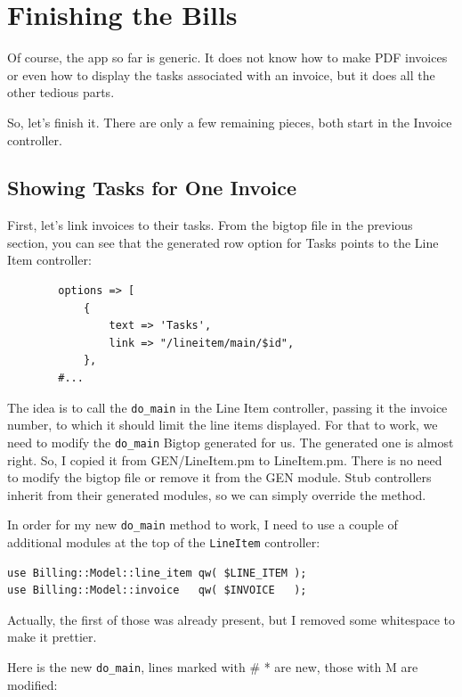\section{Finishing the Bills}

Of course, the app so far is generic.  It does not know how to make PDF
invoices or even how to display the tasks associated with an invoice, but
it does all the other tedious parts.

So, let's finish it.  There are only a few remaining pieces, both start in
the Invoice controller.

\subsection*{Showing Tasks for One Invoice}

First, let's link invoices to their tasks.  From the bigtop file in the
previous section, you can see that the generated row option for Tasks points
to the Line Item controller:

\begin{verbatim}
        options => [
            {
                text => 'Tasks',
                link => "/lineitem/main/$id",
            },
        #...
\end{verbatim}

The idea is to call the \verb+do_main+ in the Line Item controller, passing
it the invoice number, to which it should limit the line items displayed.
For that to work, we need to modify the \verb+do_main+ Bigtop generated
for us.  The generated one is almost right.  So, I copied it from
GEN/LineItem.pm to LineItem.pm.  There is no need to modify the bigtop file
or remove it from the GEN module.  Stub controllers inherit from their
generated modules, so we can simply override the method.

In order for my new \verb+do_main+ method to work, I need to use a couple
of additional modules at the top of the \verb+LineItem+ controller:

\begin{verbatim}
use Billing::Model::line_item qw( $LINE_ITEM );
use Billing::Model::invoice   qw( $INVOICE   );
\end{verbatim}

Actually, the first of those was already present, but I removed some
whitespace to make it prettier.

Here is the new \verb+do_main+, lines marked with # * are new, those
with M are modified:


